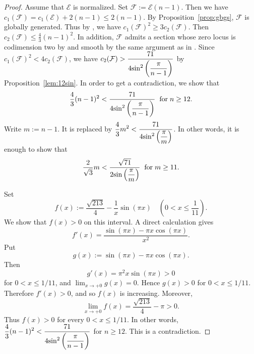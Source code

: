 \documentclass{amsproc}
\theoremstyle{definition}
\def\cE{{\mathcal E}}
\def\cF{{\mathcal F}}
\begin{document}
\begin{proof}
Assume that $\cE$ is normalized. Set $\cF:=\cE(n-1)$. Then we have $c_1(\cF)=c_1(\cE)+2(n-1)\le 2(n-1)$. By Proposition~\ref{prop:gbgs}, $\cF$ is globally generated. Thus by \cite[Proposition~1.4(A)(3)]{APW94}, we have $c_1(\cF)^2\ge 3c_2(\cF)$. Then $c_2(\cF)\le\frac{4}{3}(n-1)^2$. In addition, $\cF$ admits a section whose zero locus is codimension two by \cite[Remark~1.1.1]{H78} and smooth by the same argument as in \cite[Proposition~1.4(b)]{H78}. Since $c_1(\cF)^2< 4c_2(\cF)$, we have $c_2(\cF)>\displaystyle\frac{71}{4{\rm sin}^2\left(\displaystyle\frac{\pi}{n-1}\right)}$ by Proposition~\ref{lem:12sin}. In order to get a contradiction, we show that  
$$
\frac{4}{3}(n-1)^2 <\frac{71}{4{\rm sin}^2\left(\displaystyle\frac{\pi}{n-1}\right)} \hspace{2.0mm}{\rm for}\hspace{1.0mm} n\ge 12.
$$ 
Write $m:=n-1$. It is replaced by $\displaystyle\frac{4}{3}m^2 <\displaystyle\frac{71}{4{\rm sin}^2\left(\displaystyle\frac{\pi}{m}\right)}$. In other words, it is enough to show that 
$$
\displaystyle\frac{2}{\sqrt{3}}m <\displaystyle\frac{\sqrt{71}}{2{\rm sin}\left(\displaystyle\frac{\pi}{m}\right)} \hspace{2.0mm}{\rm for}\hspace{1.0mm} m\ge 11.
$$
 
Set
\[
f(x):=\frac{\sqrt{213}}{4}-\frac{1}{x}\sin(\pi x)
\quad
\left(0<x\leq \frac{1}{11}\right).
\]
We show that \(f(x)>0\) on this interval. A direct calculation gives
\[
f'(x)
=
\frac{\sin(\pi x)-\pi x\cos(\pi x)}{x^2}.
\]
Put
\[
g(x):=\sin(\pi x)-\pi x\cos(\pi x).
\]
Then
\[
g'(x)=\pi^2x\sin(\pi x)>0
\]
for \(0<x\leq 1/11\), and \(\displaystyle\lim_{x\to +0}g(x)=0\). Hence
\(g(x)>0\) for \(0<x\leq 1/11\). Therefore \(f'(x)>0\), and so
\(f(x)\) is increasing. Moreover,
\[
\lim_{x\to +0}f(x)
=
\frac{\sqrt{213}}{4}-\pi
>0.
\]
Thus \(f(x)>0\) for every \(0<x\leq 1/11\).
In other words, $\displaystyle\frac{4}{3}(n-1)^2 <\displaystyle\frac{71}{4{\rm sin}^2\left(\displaystyle\frac{\pi}{n-1}\right)}$ for $n\ge 12$. This is a contradiction.
\end{proof}
\end{document}
